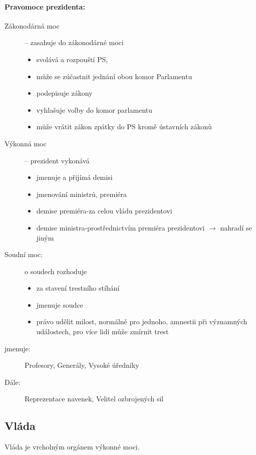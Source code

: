 \documentclass[10pt,a4paper,
twoside,%
]{report}
\begin{document}
\paragraph{Pravomoce prezidenta:}
\begin{description}
\item[Zákonodárná moc] -- zasahuje do zákonodárné moci

\begin{itemize}
\item svolává a rozpouští PS,
\item může se zúčastnit jednání obou komor Parlamentu
\item podepisuje zákony
\item vyhlašuje volby do komor parlamentu
\item může vrátit zákon zpátky do PS kromě ústavních zákonů
\end{itemize}
\item[Výkonná moc] -- prezident vykonává

\begin{itemize}
\item jmenuje a přijímá demisi
\item jmenování ministrů, premiéra
\item demise premiéra-za celou vládu prezidentovi
\item demise ministra-prostřednictvím premiéra prezidentovi $\rightarrow$ nahradí se jiným
\end{itemize}
\item[Soudní moc:]o soudech rozhoduje
  
\begin{itemize}
\item za stavení trestního stíhání
\item jmenuje soudce
\item právo udělit milost, normálně pro jednoho, amnestii při významných událostech, pro více lidí může zmírnit trest
\end{itemize}
\item[jmenuje:] Profesory, Generály, Vysoké úředníky
\item[Dále:]Reprezentace navenek, Velitel ozbrojených sil
\end{description}
\subsection{Vláda}
\begin{center}
Vláda je vrcholným orgánem výkonné moci.
\end{center}
\end{document}
